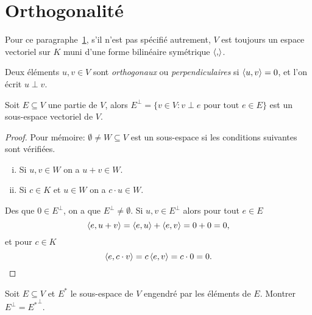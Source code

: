 \section{Orthogonalité} 
\label{sec:orthogonalite}

\begin{framed}\noindent 
  Pour ce paragraphe~\ref{sec:orthogonalite}, s'il n'est pas spécifié autrement,  $V$
  est toujours un espace vectoriel sur $K$
  muni d'une forme bilinéaire symétrique $\langle {,} \rangle$. 
\end{framed}



\begin{definition}
  \label{def:2}
 Deux éléments $u,v \in V$ sont \emph{orthogonaux} ou \emph{perpendiculaires} si $\langle {u,v} \rangle = 0$, et l'on écrit $u \perp v$. 
\end{definition}

\begin{proposition}
  \label{prop:1}
  Soit $E \subseteq V$ une partie de $V$, alors $E^\perp = \{ v \in V \colon v \perp e \text{ pour tout } e \in E \}$   est un sous-espace vectoriel de $V$. 
\end{proposition}

\begin{proof}
  Pour mémoire: $\emptyset \neq W\subseteq V$ est un sous-espace si les conditions suivantes sont vérifiées. 
  \begin{enumerate}[i)]
  \item Si $u,v \in W$ on a $u+v \in W$.  
  \item Si $c \in K$ et $u \in W$ on a $c \cdot u \in W$. 
  \end{enumerate}
  
  \noindent
  Des que $0 ∈ E^\perp  $, on a que $E^\perp≠ ∅$.  
  Si $u,v \in E^\perp$ alors pour tout $e \in E$ 
  \begin{displaymath}
    \langle {e,u+v} \rangle = \langle {e,u} \rangle + \langle {e,v} \rangle = 0 + 0 = 0,
  \end{displaymath}  
  et pour $c \in K$ 
  \begin{displaymath}
    \langle {e,c\cdot v} \rangle = c \,\langle {e,v} \rangle = c \cdot 0 = 0. 
  \end{displaymath}
\end{proof}



\begin{exercise}
  \label{exe:1}
  Soit $E \subseteq V$ et $E^*$ le sous-espace de $V$ engendré par les éléments de $E$. Montrer $E^\perp = {E^*}^\perp$. 
\end{exercise}


